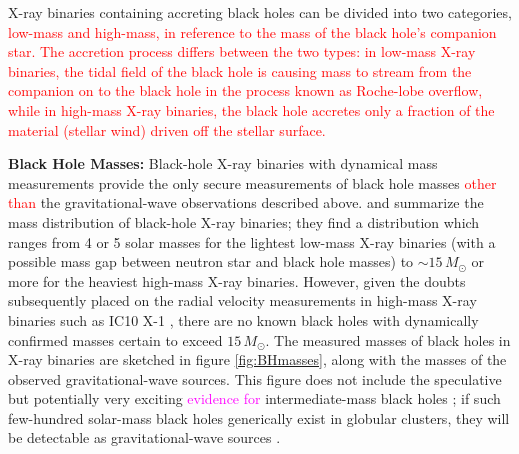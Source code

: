\documentclass[iop,onecolumn]{revtex4}
\newcommand{\todo}[1]{\textcolor{red}{#1}}
\newcommand{\ajf}[1]{\textcolor{red}{#1}}
\newcommand{\ilya}[1]{\textcolor{magenta}{#1}}
\begin{document}
X-ray binaries containing accreting black holes can be divided into two categories, \ajf{low-mass and high-mass, in reference to the mass of the black hole's companion star. The accretion process differs between the two types: in low-mass X-ray binaries, the tidal field of the black hole is causing mass to stream from the companion on to the black hole in the process known as Roche-lobe overflow, while in high-mass X-ray binaries, the black hole accretes only a fraction of the material (stellar wind) driven off the stellar surface.}

\textbf{Black Hole Masses:} 
Black-hole X-ray binaries with dynamical mass measurements provide the only secure measurements of black hole masses \ajf{other than} the gravitational-wave observations described above.  \citet{Ozel:2010} and \citet{Farr:2011} summarize the mass distribution of black-hole X-ray binaries; they find a distribution which ranges from 4 or 5 solar masses for the lightest low-mass X-ray binaries (with a possible mass gap between neutron star and black hole masses) to $\sim 15\, M_\odot$ or more for the heaviest high-mass X-ray binaries.  However, given the doubts subsequently placed on the radial velocity measurements in high-mass X-ray binaries such as IC10 X-1 \citep{Laycock:2015}, there are no known black holes with dynamically confirmed masses certain to exceed $15\, M_\odot$.  The measured masses of black holes in X-ray binaries are sketched in figure \ref{fig:BHmasses}, along with the masses of the observed gravitational-wave sources.  This figure does not include the speculative but potentially very exciting \ilya{evidence for} intermediate-mass black holes \citep{MillerColbert:2004,Pasham:2014}; if such few-hundred solar-mass black holes generically exist in globular clusters, they will be detectable as gravitational-wave sources \ilya{\citep[e.g.,][]{Mandel:2008,IMBBH:O1}}.
\end{document}
